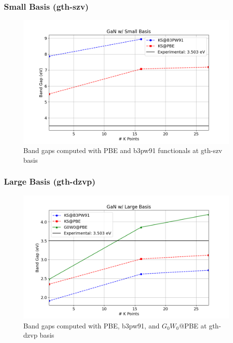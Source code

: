 \documentclass[12pt]{article}
\begin{document}
\subsubsection{Small Basis (gth-szv)}
\begin{figure}[h]
\centering
\includegraphics[width=\textwidth]{band_gaps_szv.png}
\caption{Band gaps computed with PBE and b3pw91 functionals at gth-szv basis}
\end{figure}
\subsubsection{Large Basis (gth-dzvp)}
\begin{figure}[h]
\centering
\includegraphics[width=\textwidth]{band_gaps_dzvp.png}
\caption{Band gaps computed with PBE, b3pw91, and $G_0W_0$@PBE at gth-dzvp basis}
\end{figure}
\newpage
\printbibliography
\end{document}
